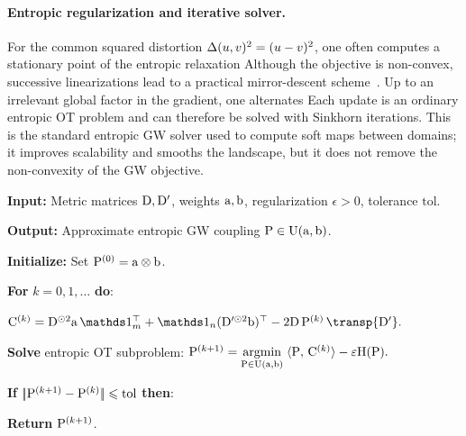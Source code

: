 \paragraph{Entropic regularization and iterative solver.}

For the common squared distortion $\De(u,v)^2=(u-v)^2$, one often computes a stationary point of the entropic relaxation
Although the objective is non-convex, successive linearizations lead to a practical mirror-descent scheme~\cite{peyre2016gromov}. Up to an irrelevant global factor in the gradient, one alternates
Each update is an ordinary entropic OT problem and can therefore be solved with Sinkhorn iterations. This is the standard entropic GW solver used to compute soft maps between domains; it improves scalability and smooths the landscape, but it does not remove the non-convexity of the GW objective.

\begin{alg}\label{alg:entropic-gromov-wasserstein}
\textbf{Input:} Metric matrices $\distD,\distD'$, weights $\a,\b$, regularization $\epsilon>0$, tolerance $\mathrm{tol}$.

\textbf{Output:} Approximate entropic GW coupling $\P\in\CouplingsD(\a,\b)$.

\textbf{Initialize:} Set $\P^{(0)}=\a\otimes\b$.

\textbf{For} $k=0,1,\ldots$ \textbf{do}:
\begin{algblock}
\(\C^{(k)} = \distD^{\odot2}\a\,\ones_m^\top + \ones_n(\distD'^{\odot2}\b)^\top - 2\distD\,\P^{(k)}\,\transp{\distD'}.\)

\textbf{Solve} entropic OT subproblem:
\(\P^{(k+1)} = \uargmin{\P\in\CouplingsD(\a,\b)} \dotp{\P}{\C^{(k)}}-\epsilon\HD(\P).\)

\textbf{If} $\norm{\P^{(k+1)}-\P^{(k)}}\leq\mathrm{tol}$ \textbf{then}:
\begin{algblock}
\textbf{Return} $\P^{(k+1)}$.
\end{algblock}
\end{algblock}
\end{alg}

